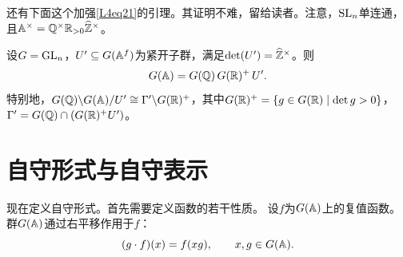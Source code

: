 还有下面这个加强\eqref{L4eq21}的引理。其证明不难，留给读者。注意，$\operatorname{SL}_n$单连通，且$\mathbb{A}^\times=\mathbb{Q}^\times\mathbb{R}_{>0}\widehat{\mathbb{Z}}^{\times}$。
\begin{lemma}\label{L4S2O2}
设$G=\operatorname{GL}_n$，$U'\subseteq G(\mathbb{A}^f)$为紧开子群，满足$\det(U')=\widehat{\mathbb{Z}}^\times$。则
\[G(\mathbb{A})=G(\mathbb{Q})\,G(\mathbb{R})^+\,U'.\]
特别地，$G(\mathbb{Q})\backslash G(\mathbb{A})/U'\cong\Gamma'\backslash G(\mathbb{R})^+$，其中$G(\mathbb{R})^+=\{g\in G(\mathbb{R})\mid\det g>0\}$，$\Gamma'=G(\mathbb{Q})\cap(G(\mathbb{R})^+U')$。
\end{lemma}
\section{自守形式与自守表示}\label{L4S3}
现在定义自守形式。首先需要定义函数的若干性质。
设$f$为$G(\mathbb{A})$上的复值函数。群$G(\mathbb{A})$通过右平移作用于$f$：
\[(g\cdot f)(x)=f(xg),\qquad x,g\in G(\mathbb{A}).\]
